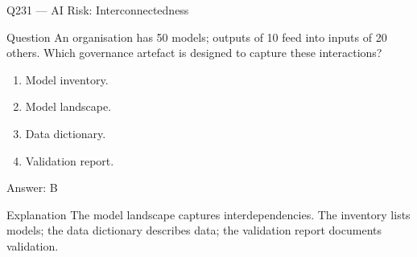 \documentclass[aspectratio=169,8pt]{beamer}
\begin{document}
																																						\begin{frame}{Q231 --- AI Risk: Interconnectedness}
																																							\begin{block}{Question}
																																								An organisation has 50 models; outputs of 10 feed into inputs of 20 others. Which governance artefact is designed to capture these interactions?
																																								\begin{enumerate}
																																									\item Model inventory.
																																									\item Model landscape.
																																									\item Data dictionary.
																																									\item Validation report.
																																								\end{enumerate}  \end{block}
																																								\begin{exampleblock}{Answer: B}\end{exampleblock}
																																								\begin{block}{Explanation}
																																									The model landscape captures interdependencies. The inventory lists models; the data dictionary describes data; the validation report documents validation.
																																								\end{block}
																																							\end{frame}
																																							
\end{document}
